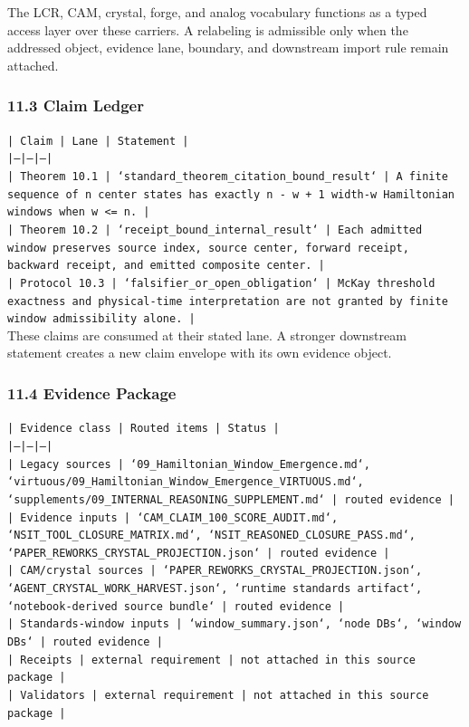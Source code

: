 \documentclass[11pt]{article}
\begin{document}
The LCR, CAM, crystal, forge, and analog vocabulary functions as a typed access
layer over these carriers. A relabeling is admissible only when the addressed
object, evidence lane, boundary, and downstream import rule remain attached.

\subsubsection*{11.3 Claim Ledger}

\noindent\texttt{| Claim | Lane | Statement |}\\
\noindent\texttt{|---|---|---|}\\
\noindent\texttt{| Theorem 10.1 | `standard\_theorem\_citation\_bound\_result` | A finite sequence of n center states has exactly n - w + 1 width-w Hamiltonian windows when w <= n. |}\\
\noindent\texttt{| Theorem 10.2 | `receipt\_bound\_internal\_result` | Each admitted window preserves source index, source center, forward receipt, backward receipt, and emitted composite center. |}\\
\noindent\texttt{| Protocol 10.3 | `falsifier\_or\_open\_obligation` | McKay threshold exactness and physical-time interpretation are not granted by finite window admissibility alone. |}\\

These claims are consumed at their stated lane. A stronger downstream statement
creates a new claim envelope with its own evidence object.

\subsubsection*{11.4 Evidence Package}

\noindent\texttt{| Evidence class | Routed items | Status |}\\
\noindent\texttt{|---|---|---|}\\
\noindent\texttt{| Legacy sources | `09\_Hamiltonian\_Window\_Emergence.md`, `virtuous/09\_Hamiltonian\_Window\_Emergence\_VIRTUOUS.md`, `supplements/09\_INTERNAL\_REASONING\_SUPPLEMENT.md` | routed evidence |}\\
\noindent\texttt{| Evidence inputs | `CAM\_CLAIM\_100\_SCORE\_AUDIT.md`, `NSIT\_TOOL\_CLOSURE\_MATRIX.md`, `NSIT\_REASONED\_CLOSURE\_PASS.md`, `PAPER\_REWORKS\_CRYSTAL\_PROJECTION.json` | routed evidence |}\\
\noindent\texttt{| CAM/crystal sources | `PAPER\_REWORKS\_CRYSTAL\_PROJECTION.json`, `AGENT\_CRYSTAL\_WORK\_HARVEST.json`, `runtime standards artifact`, `notebook-derived source bundle` | routed evidence |}\\
\noindent\texttt{| Standards-window inputs | `window\_summary.json`, `node DBs`, `window DBs` | routed evidence |}\\
\noindent\texttt{| Receipts | external requirement | not attached in this source package |}\\
\noindent\texttt{| Validators | external requirement | not attached in this source package |}\\
\end{document}
